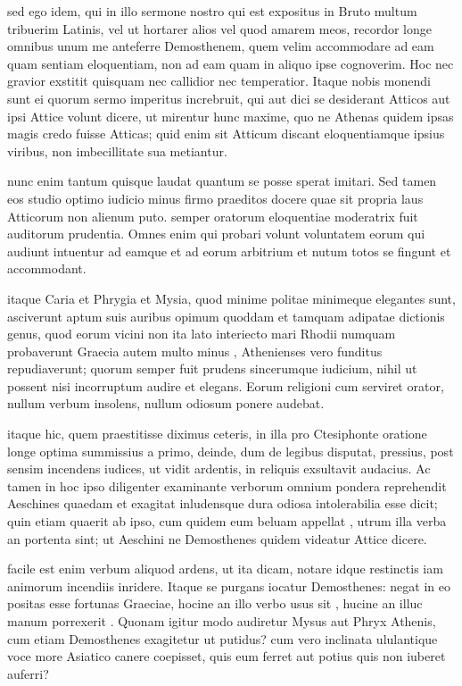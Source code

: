  sed ego idem, qui in illo sermone nostro qui est expositus in Bruto multum tribuerim Latinis, vel ut hortarer alios vel quod amarem meos, recordor longe omnibus unum me anteferre Demosthenem, quem velim accommodare ad eam quam sentiam eloquentiam, non ad eam quam in aliquo ipse cognoverim. Hoc nec gravior exstitit quisquam nec callidior nec temperatior. Itaque nobis monendi sunt ei quorum sermo imperitus increbruit, qui aut dici se desiderant Atticos aut ipsi Attice volunt dicere, ut mirentur hunc maxime, quo ne Athenas quidem ipsas magis credo fuisse Atticas; quid enim sit Atticum discant eloquentiamque ipsius viribus, non imbecillitate sua metiantur.

 nunc enim tantum quisque laudat quantum se posse sperat imitari. Sed tamen eos studio optimo iudicio minus firmo praeditos docere quae sit propria laus Atticorum non alienum puto. semper oratorum eloquentiae moderatrix fuit auditorum prudentia. Omnes enim qui probari volunt voluntatem eorum qui audiunt intuentur ad eamque et ad eorum arbitrium et nutum totos se fingunt et accommodant.

 itaque Caria et Phrygia et Mysia, quod minime politae minimeque elegantes sunt, asciverunt aptum suis auribus opimum quoddam et tamquam adipatae dictionis genus, quod eorum vicini non ita lato interiecto mari Rhodii numquam probaverunt Graecia autem multo minus , Athenienses vero funditus repudiaverunt; quorum semper fuit prudens sincerumque iudicium, nihil ut possent nisi incorruptum audire et elegans. Eorum religioni cum serviret orator, nullum verbum insolens, nullum odiosum ponere audebat.

 itaque hic, quem praestitisse diximus ceteris, in illa pro Ctesiphonte oratione longe optima summissius a primo, deinde, dum de legibus disputat, pressius, post sensim incendens iudices, ut vidit ardentis, in reliquis exsultavit audacius. Ac tamen in hoc ipso diligenter examinante verborum omnium pondera reprehendit Aeschines quaedam et exagitat inludensque dura odiosa intolerabilia esse dicit; quin etiam quaerit ab ipso, cum quidem eum beluam appellat , utrum illa verba an portenta sint; ut Aeschini ne Demosthenes quidem videatur Attice dicere.

 facile est enim verbum aliquod ardens, ut ita dicam, notare idque restinctis iam animorum incendiis inridere. Itaque se purgans iocatur Demosthenes: negat in eo positas esse fortunas Graeciae, hocine an illo verbo usus sit , hucine an illuc manum porrexerit . Quonam igitur modo audiretur Mysus aut Phryx Athenis, cum etiam Demosthenes exagitetur ut putidus? cum vero inclinata ululantique voce more Asiatico canere coepisset, quis eum ferret aut potius quis non iuberet auferri?

